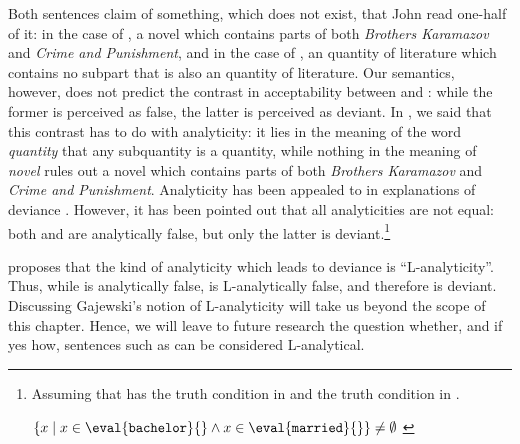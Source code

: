 \documentclass[output=paper]{langscibook}
\begin{document}
\noindent Both sentences claim of something, which does not exist, that John read one-half of it: in the case of , a novel which contains parts of both \textit{Brothers Karamazov} and \textit{Crime and Punishment}, and in the case of , an quantity of literature which contains no subpart that is also an quantity of literature. Our semantics, however, does not predict the contrast in acceptability between  and : while the former is perceived as false, the latter is perceived as deviant. In , we said that this contrast has to do with analyticity: it lies in the meaning of the word \textit{quantity} that any subquantity is a quantity, while nothing in the meaning of \textit{novel} rules out a novel which contains parts of both \textit{Brothers Karamazov} and \textit{Crime and Punishment}. Analyticity has been appealed to in explanations of deviance \citep[cf.][]{Barwise:1981, vonFintel:1993, krifka1995semantics, abrusan2007contradiction}. However, it has been pointed out that all analyticities are not equal: both  and  are analytically false, but only the latter is deviant.\footnote{Assuming that  has the truth condition in  \citep[cf.][]{heimkratzer1998semantics} and  the truth condition in  \citep[cf.][]{vonFintel:1993}.

\ea
\ea $\{x \mid x \in \eval{\texttt{bachelor}}{} \wedge x \in \eval{\texttt{married}}{}\} \neq \emptyset$
\label{hai-tri:tcbachelors} 
\label{hai-tri:tcexceptive}
\z
\z
} 

\ea 
{}
\label{hai-tri:bachelors}
\label{hai-tri:exceptive} 
\z
\z

\noindent \citet{gajewski2003analyticity} proposes that the kind of analyticity which leads to deviance is ``L-analyticity''. Thus, while  is analytically false,  is L-analytically false, and therefore is deviant. Discussing Gajewski's notion of L-analyticity will take us beyond the scope of this chapter. Hence, we will leave to future research the question whether, and if yes how, sentences such as  can be considered L-analytical.
\end{document}
